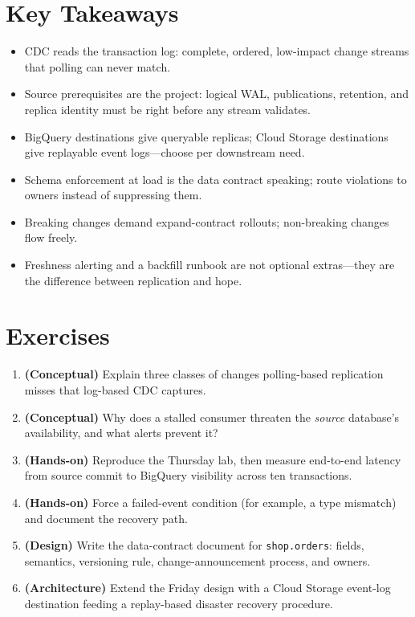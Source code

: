 \section*{Key Takeaways}
\begin{itemize}
    \item CDC reads the transaction log: complete, ordered, low-impact change streams that polling can never match.
    \item Source prerequisites are the project: logical WAL, publications, retention, and replica identity must be right before any stream validates.
    \item BigQuery destinations give queryable replicas; Cloud Storage destinations give replayable event logs---choose per downstream need.
    \item Schema enforcement at load is the data contract speaking; route violations to owners instead of suppressing them.
    \item Breaking changes demand expand-contract rollouts; non-breaking changes flow freely.
    \item Freshness alerting and a backfill runbook are not optional extras---they are the difference between replication and hope.
\end{itemize}

\section{Exercises}
\begin{enumerate}
    \item \textbf{(Conceptual)} Explain three classes of changes polling-based replication misses that log-based CDC captures.
    \item \textbf{(Conceptual)} Why does a stalled consumer threaten the \emph{source} database's availability, and what alerts prevent it?
    \item \textbf{(Hands-on)} Reproduce the Thursday lab, then measure end-to-end latency from source commit to BigQuery visibility across ten transactions.
    \item \textbf{(Hands-on)} Force a failed-event condition (for example, a type mismatch) and document the recovery path.
    \item \textbf{(Design)} Write the data-contract document for \texttt{shop.orders}: fields, semantics, versioning rule, change-announcement process, and owners.
    \item \textbf{(Architecture)} Extend the Friday design with a Cloud Storage event-log destination feeding a replay-based disaster recovery procedure.
\end{enumerate}
